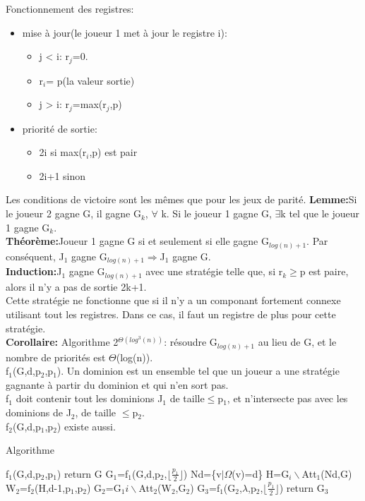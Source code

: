 Fonctionnement des registres:
\begin{itemize}
  \item mise \`a jour(le joueur 1 met \`a jour le registre i):
  \begin{itemize}
    \item j < i: r$_j$=0.
    \item r$_i$= p(la valeur sortie)
    \item j > i: r$_j$=max(r$_j$,p)
  \end{itemize}
  \item priorit\'e de sortie:
  \begin{itemize}
    \item 2i si max(r$_i$,p) est pair
    \item 2i+1 sinon
  \end{itemize}
\end{itemize}
Les conditions de victoire sont les m\^emes que pour les jeux de parit\'e.
\medskip
\textbf{Lemme:}Si le joueur 2 gagne G, il gagne G$_k$, $\forall$ k. Si le joueur 1 gagne G, $\exists$k tel que le
joueur 1 gagne G$_k$.\\
\textbf{Th\'eor\`eme:}Joueur 1 gagne G si et seulement si elle gagne G$_{log(n)+1}$. Par cons\'equent, J$_1$ gagne
G$_{log(n)+1}\Rightarrow$J$_1$ gagne G.\\
\textbf{Induction:}J$_1$ gagne G$_{log(n)+1}$ avec une strat\'egie telle que, si r$_k\geq$p est paire, alors il n'y a
pas de sortie 2k+1.\\
Cette strat\'egie ne fonctionne que si il n'y a un componant fortement connexe utilisant tout les registres. Dans ce
cas, il faut un registre de plus pour cette strat\'egie.\\
\textbf{Corollaire:} Algorithme 2$^{\Theta(log^3(n))}$: r\'esoudre G$_{log(n)+1}$ au lieu de G, et le nombre de
priorit\'es est $\Theta$(log(n)).\\
\medskip
f$_1$(G,d,p$_2$,p$_1$). Un dominion est un ensemble tel que un joueur a une strat\'egie gagnante \`a partir du dominion
et qui n'en sort pas.\\
\medskip
f$_1$ doit contenir tout les dominions J$_1$ de taille$\leq$p$_1$, et n'intersecte pas avec les dominions de J$_2$, de
taille $\leq$p$_2$.\\
f$_2$(G,d,p$_1$,p$_2$) existe aussi.\\
\begin{algorithm}
  \caption{Algorithme}
  \begin{algorithmic}
    \STATE f$_1$(G,d,p$_2$,p$_1$)
      \STATE return G
    \ENDIF
    \STATE G$_1$=f$_1$(G,d,p$_2$,$\lfloor\frac{p_1}{2}\rfloor$)
    \STATE Nd=\{v$\mid\Omega$(v)=d\}
    \STATE H=G$_i\backslash$Att$_1$(Nd,G)
    \STATE W$_2$=f$_2$(H,d-1,p$_1$,p$_2$)
    \STATE G$_2$=G$_1i\backslash$Att$_2$(W$_2$,G$_2$)
    \STATE G$_3$=f$_1$(G$_2$,$\lambda$,p$_2$,$\lfloor\frac{p_1}{2}\rfloor$)
    \STATE return G$_3$
  \end{algorithmic}
\end{algorithm}
